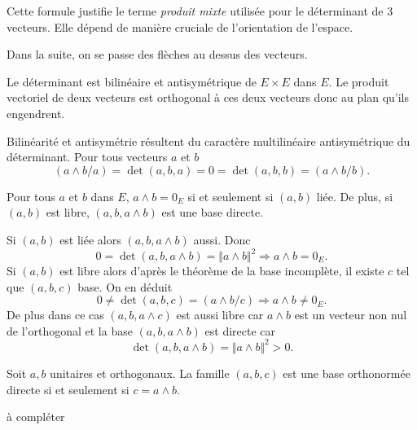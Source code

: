Cette formule justifie le terme \emph{produit mixte} utilisée pour le déterminant de 3 vecteurs. Elle dépend de manière cruciale de l'orientation de l'espace.

Dans la suite, on se passe des flèches au dessus des vecteurs.
\begin{propn}
 Le déterminant est bilinéaire et antisymétrique de $E\times E$ dans $E$. Le produit vectoriel de deux vecteurs est orthogonal à ces deux vecteurs donc au plan qu'ils engendrent.
\end{propn}
\begin{demo}
 Bilinéarité et antisymétrie résultent du caractère multilinéaire antisymétrique du déterminant. Pour tous vecteurs $a$ et $b$
 \[
  (a\wedge b /a) = \det(a,b,a) = 0 = \det(a,b,b) = (a\wedge b / b).
 \]
\end{demo}
\clearpage
\begin{propn}
 Pour tous $a$ et $b$ dans $E$, $a \wedge b = 0_E$ si et seulement si $(a,b)$ liée. De plus, si $(a,b)$ est libre, $(a,b,a \wedge b)$ est une base directe.
\end{propn}
\begin{demo}
 Si $(a,b)$ est liée alors $(a,b,a\wedge b)$ aussi. Donc
 \[
  0 = \det(a,b,a\wedge b) = \Vert a\wedge b \Vert^2 \Rightarrow a\wedge b = 0_E.
 \]
Si $(a,b)$ est libre alors d'après le théorème de la base incomplète, il existe $c$ tel que $(a,b,c)$ base. On en déduit
\[
 0 \neq \det(a,b,c) = (a\wedge b / c) \Rightarrow a\wedge b \neq 0_E.
\]
De plus dans ce cas $(a,b,a\wedge c)$ est aussi libre car $a\wedge b$ est un vecteur non nul de l'orthogonal et la base $(a,b,a\wedge b)$ est directe car
\[
\det(a,b,a \wedge b) = \Vert a\wedge b \Vert^2 > 0. 
\]
\end{demo}

\begin{propn}
 Soit $a,b$ unitaires et orthogonaux. La famille $(a,b,c)$ est une base orthonormée directe si et seulement si $c = a \wedge b$. 
\end{propn}
\begin{demo}
 à compléter
\end{demo}

